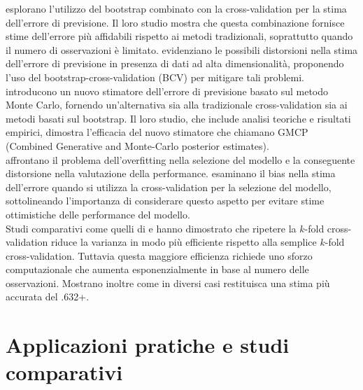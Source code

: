 \textcite{Fuetal} esplorano l'utilizzo del bootstrap combinato con la cross-validation per la stima dell'errore di previsione. Il loro studio mostra che questa combinazione fornisce stime dell'errore più affidabili rispetto ai metodi tradizionali, soprattutto quando il numero di osservazioni è limitato. \textcite{vansanden} evidenziano le possibili distorsioni nella stima dell'errore di previsione in presenza di dati ad alta dimensionalità, proponendo l'uso del bootstrap-cross-validation (BCV) per mitigare tali problemi. \textcite{hefny} introducono un nuovo stimatore dell'errore di previsione basato sul metodo Monte Carlo, fornendo un'alternativa sia alla tradizionale cross-validation sia ai metodi basati sul bootstrap. Il loro studio, che include analisi teoriche e risultati empirici, dimostra l'efficacia del nuovo stimatore che chiamano GMCP (Combined Generative and Monte-Carlo posterior estimates).\\
\textcite{cawley} affrontano il problema dell'overfitting nella selezione del modello e la conseguente distorsione nella valutazione della performance. \textcite{varma} esaminano il bias nella stima dell'errore quando si utilizza la cross-validation per la selezione del modello, sottolineando l'importanza di considerare questo aspetto per evitare stime ottimistiche delle performance del modello.\\
Studi comparativi come quelli di \textcite{wongTT} e \textcite{kim2009} hanno dimostrato che ripetere la  $k$-fold cross-validation riduce la varianza in modo più efficiente rispetto alla semplice $k$-fold cross-validation. Tuttavia questa maggiore efficienza richiede uno sforzo computazionale che aumenta esponenzialmente in base al numero delle osservazioni. Mostrano inoltre come in diversi casi restituisca una stima più accurata del .632+.


\section{Applicazioni pratiche e studi comparativi}
\label{sec:sezione7.5}


